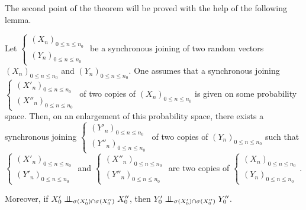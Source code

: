 \documentclass[12pt,a4paper]{article}
\begin{document}
The second point of the theorem will be proved with the help of the following lemma. 

\begin{lemma}\label{lemma:quadricoimm}
Let 
$\left\{\begin{smallmatrix} {(X_n)}_{0 \leq n \leq n_0} \\ 
{(Y_n)}_{0 \leq n \leq n_0}
\end{smallmatrix}\right.$  
be a synchronous joining of two random vectors 
${(X_n)}_{0 \leq n \leq n_0}$ and ${(Y_n)}_{0 \leq n \leq n_0}$. 
One assumes that a synchronous joining 
$\left\{\begin{smallmatrix} {(X'_n)}_{0 \leq n \leq n_0} \\ 
{(X''_n)}_{0 \leq n \leq n_0}
\end{smallmatrix}\right.$
 of two copies of ${(X_n)}_{0 \leq n \leq n_0}$ 
is given on some probability space.  
Then, on an enlargement of this probability space, there 
exists a synchronous joining 
$\left\{\begin{smallmatrix} {(Y'_n)}_{0 \leq n \leq n_0} \\ 
{(Y''_n)}_{0 \leq n \leq n_0}
\end{smallmatrix}\right.$
of two copies of ${(Y_n)}_{0 \leq n \leq n_0}$ 
such that  
$\left\{\begin{smallmatrix} {(X'_n)}_{0 \leq n \leq n_0} \\ 
{(Y'_n)}_{0 \leq n \leq n_0}
\end{smallmatrix}\right.$ and 
$\left\{\begin{smallmatrix} {(X''_n)}_{0 \leq n \leq n_0} \\ 
{(Y''_n)}_{0 \leq n \leq n_0}
\end{smallmatrix}\right.$
are two copies of 
$\left\{\begin{smallmatrix} {(X_n)}_{0 \leq n \leq n_0} \\ 
{(Y_n)}_{0 \leq n \leq n_0}
\end{smallmatrix}\right.$.

Moreover, if $X'_0 \indep_{\sigma(X'_0)\cap\sigma(X''_0)} X''_0$, then 
 $Y'_0 \indep_{\sigma(X'_0)\cap\sigma(X''_0)} Y''_0$.
\end{lemma}
\end{document}
